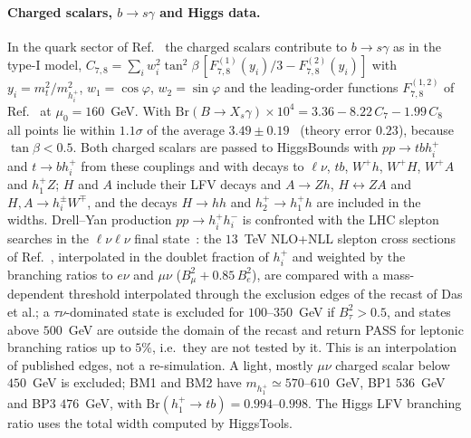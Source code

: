 \documentclass[twocolumn,epjc3]{svjour3}
\newcommand{\HG}{Ref.~\cite{HerreroGarcia:2017xdq}}
\newcommand{\Br}{\mathrm{Br}}
\begin{document}
\paragraph{Charged scalars, $b\to s\gamma$ and Higgs data.} In the quark sector of \HG{} the charged scalars contribute to $b\to s\gamma$ as in the type-I model, $C_{7,8}=\sum_i w_i^2\tan^2\beta\,[F^{(1)}_{7,8}(y_i)/3-F^{(2)}_{7,8}(y_i)]$ with $y_i=m_t^2/m_{h_i^+}^2$, $w_1=\cos\varphi$, $w_2=\sin\varphi$ and the leading-order functions $F^{(1,2)}_{7,8}$ of Ref.~\cite{Ciuchini:1997xe} at $\mu_0=160$~GeV. With $\Br(B\to X_s\gamma)\times10^4=3.36-8.22\,C_7-1.99\,C_8$~\cite{Misiak:2017woa} all points lie within $1.1\sigma$ of the average $3.49\pm0.19$~\cite{HFLAV:2021} (theory error $0.23$), because $\tan\beta<0.5$. Both charged scalars are passed to HiggsBounds with $pp\to tbh_i^+$ and $t\to bh_i^+$ from these couplings and with decays to $\ell\nu$, $tb$, $W^+h$, $W^+H$, $W^+A$ and $h_1^+Z$; $H$ and $A$ include their LFV decays and $A\to Zh$, $H\leftrightarrow ZA$ and $H,A\to h_i^\pm W^\mp$, and the decays $H\to hh$ and $h_2^+\to h_1^+h$ are included in the widths. Drell--Yan production $pp\to h_i^+h_i^-$ is confronted with the LHC slepton searches in the $\ell\nu\ell\nu$ final state~\cite{Alcaide:2019kdq,Das:2025dy}: the $13$~TeV NLO+NLL slepton cross sections of Ref.~\cite{Fuks:2013lya}, interpolated in the doublet fraction of $h_i^+$ and weighted by the branching ratios to $e\nu$ and $\mu\nu$ ($B_\mu^2+0.85\,B_e^2$), are compared with a mass-dependent threshold interpolated through the exclusion edges of the recast of Das et al.; a $\tau\nu$-dominated state is excluded for $100$--$350$~GeV if $B_\tau^2>0.5$, and states above $500$~GeV are outside the domain of the recast and return PASS for leptonic branching ratios up to $5\%$, i.e.\ they are not tested by it. This is an interpolation of published edges, not a re-simulation. A light, mostly $\mu\nu$ charged scalar below $450$~GeV is excluded; BM1 and BM2 have $m_{h_1^+}\simeq570$--$610$~GeV, BP1 $536$~GeV and BP3 $476$~GeV, with $\Br(h_1^+\to tb)=0.994$--$0.998$. The Higgs LFV branching ratio uses the total width computed by HiggsTools.
\end{document}
